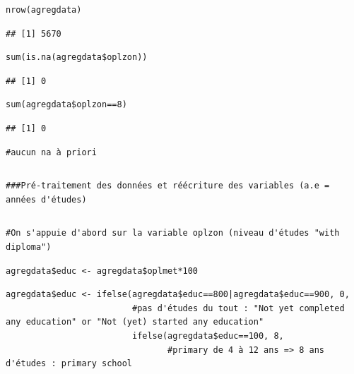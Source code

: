 \documentclass[a4paper, french, 11 pt]{article}\usepackage[]{graphicx}\usepackage[]{xcolor}
\makeatletter
\newenvironment{kframe}{%
 \def\at@end@of@kframe{}%
 \ifinner\ifhmode%
  \def\at@end@of@kframe{\end{minipage}}%
  \begin{minipage}{\columnwidth}%
 \fi\fi%
 \def\FrameCommand##1{\hskip\@totalleftmargin \hskip-\fboxsep
 \colorbox{shadecolor}{##1}\hskip-\fboxsep
     \hskip-\linewidth \hskip-\@totalleftmargin \hskip\columnwidth}%
 \MakeFramed {\advance\hsize-\width
   \@totalleftmargin\z@ \linewidth\hsize
   \@setminipage}}%
 {\par\unskip\endMakeFramed%
 \at@end@of@kframe}
\newenvironment{knitrout}{}{} %
\makeatother
\begin{document}
\begin{knitrout}
\begin{kframe}
\begin{lstlisting}[basicstyle=\ttfamily,breaklines=true]
\end{lstlisting}
\begin{lstlisting}[basicstyle=\ttfamily,breaklines=true]
nrow(agregdata)\end{lstlisting}
\begin{lstlisting}[basicstyle=\ttfamily,breaklines=true]
## [1] 5670
\end{lstlisting}
\begin{lstlisting}[basicstyle=\ttfamily,breaklines=true]
sum(is.na(agregdata$oplzon))\end{lstlisting}
\begin{lstlisting}[basicstyle=\ttfamily,breaklines=true]
## [1] 0
\end{lstlisting}
\begin{lstlisting}[basicstyle=\ttfamily,breaklines=true]
sum(agregdata$oplzon==8)\end{lstlisting}
\begin{lstlisting}[basicstyle=\ttfamily,breaklines=true]
## [1] 0
\end{lstlisting}
\begin{lstlisting}[basicstyle=\ttfamily,breaklines=true]
#aucun na à priori\end{lstlisting}
\begin{lstlisting}[basicstyle=\ttfamily,breaklines=true]
\end{lstlisting}
\begin{lstlisting}[basicstyle=\ttfamily,breaklines=true]
###Pré-traitement des données et réécriture des variables (a.e = années d'études)\end{lstlisting}
\begin{lstlisting}[basicstyle=\ttfamily,breaklines=true]
\end{lstlisting}
\begin{lstlisting}[basicstyle=\ttfamily,breaklines=true]
#On s'appuie d'abord sur la variable oplzon (niveau d'études "with diploma")\end{lstlisting}
\begin{lstlisting}[basicstyle=\ttfamily,breaklines=true]
agregdata$educ <- agregdata$oplmet*100\end{lstlisting}
\begin{lstlisting}[basicstyle=\ttfamily,breaklines=true]
agregdata$educ <- ifelse(agregdata$educ==800|agregdata$educ==900, 0,
                         #pas d'études du tout : "Not yet completed any education" or "Not (yet) started any education"
                         ifelse(agregdata$educ==100, 8,
                                #primary de 4 à 12 ans => 8 ans d'études : primary school

\end{lstlisting}
\end{kframe}
\end{knitrout}
\end{document}
